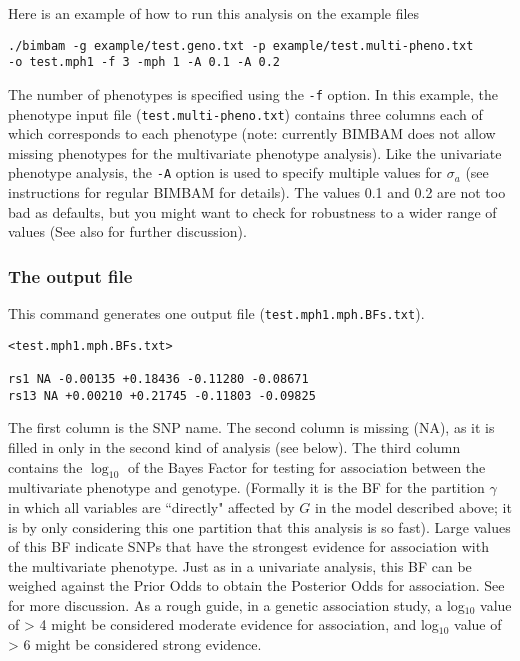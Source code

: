 \documentclass[11pt]{article}
\def\logten{\log_{10}}
\begin{document}
Here is an example of how to run this analysis on the example files
\begin{verbatim}
./bimbam -g example/test.geno.txt -p example/test.multi-pheno.txt 
-o test.mph1 -f 3 -mph 1 -A 0.1 -A 0.2
\end{verbatim} 
The number of phenotypes is specified using the \verb+-f+ option.  
In this example, the phenotype input file (\verb+test.multi-pheno.txt+) contains three columns each of which corresponds to each phenotype (note: currently BIMBAM does not allow missing phenotypes for the multivariate phenotype analysis). 
Like the univariate phenotype analysis, the \verb+-A+ option is used to specify multiple values for $\sigma_a$ (see instructions for regular BIMBAM for details). The values 0.1 and 0.2 are not too bad as defaults, but you might want to check for robustness to a wider range of values (See also \cite{Stephens2009} for further discussion).

\subsubsection{The output file}

This command generates one output file (\verb+test.mph1.mph.BFs.txt+). 
\begin{verbatim}
<test.mph1.mph.BFs.txt>

rs1 NA -0.00135 +0.18436 -0.11280 -0.08671
rs13 NA +0.00210 +0.21745 -0.11803 -0.09825
\end{verbatim}


The first column is the SNP name. The second column is missing (NA), as it is filled in only in the second kind of analysis (see below).  The third column contains the $\logten$ of the Bayes Factor for testing for association between the multivariate phenotype and genotype. (Formally it is the BF for the partition $\gamma$ in which all variables are ``directly" affected by $G$ in the model described above; it is by only considering this one partition that this analysis is so fast). Large values of this BF indicate SNPs that have the strongest evidence for association with the multivariate phenotype. 
Just as in a univariate analysis, this BF can be weighed against the Prior Odds to obtain the Posterior Odds for association. See \cite{Stephens2009} for more discussion. As a rough guide, in a genetic association study, a log$_{10}$ value of > 4 might be considered moderate evidence for association, and log$_{10}$ value of > 6 might be considered strong evidence.
\end{document}
